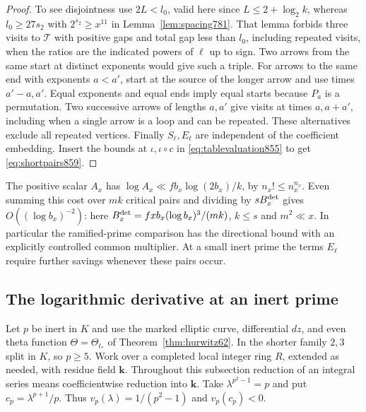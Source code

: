 \documentclass[a4paper,11pt]{article}
\theoremstyle{definition}
\theoremstyle{remark}
\numberwithin{equation}{section}
\begin{document}
\begin{proof}
To see disjointness use \(2L<l_0\), valid here since
\(L\le2+\log_2 k\), whereas \(l_0\ge27s_2\) with
\(2^{s_2}\ge x^{11}\) in Lemma~\ref{lem:spacing781}.
That lemma forbids three visits to \(\mathcal T\) with positive
gaps and total gap less than \(l_0\), including repeated
visits, when the ratios are the indicated powers of \(\ell\)
up to sign. Two arrows from the same start at distinct
exponents would give such a triple. For arrows to the same
end with exponents \(a<a'\), start at the source of the
longer arrow and use times \(a'-a,a'\). Equal exponents
and equal ends imply equal starts because \(P_a\) is a
permutation. Two successive arrows of lengths \(a,a'\)
give visits at times \(a,a+a'\), including when a single
arrow is a loop and can be repeated. These alternatives
exclude all repeated vertices. Finally \(S_\ell,E_\ell\)
are independent of the coefficient embedding. Insert the
bounds at \(\iota,\iota\circ c\) in \eqref{eq:tablevaluation855}
to get \eqref{eq:shortpairs859}.
\end{proof}

The positive scalar \(A_x\) has
\(\log A_x\ll f b_x\log(2b_x)/k\), by \(n_x!\le n_x^{n_x}\).
Even summing this cost over \(mk\) critical pairs and
dividing by \(sB_x^{\rm det}\) gives
\(O((\log b_x)^{-2})\): here
\(B_x^{\rm det}=fxb_x(\log b_x)^3/(mk)\), \(k\le s\) and
\(m^2\ll x\). In particular the ramified-prime comparison
has the directional bound with an explicitly controlled
common multiplier. At a small inert prime the terms
\(E_\ell\) require further savings whenever these pairs occur.
\clearpage

\subsection{The logarithmic derivative at an inert prime}
\label{sec:inertgradient860}
Let \(p\) be inert in \(K\) and use the marked elliptic curve,
differential \(dz\), and even theta function \(\Theta=\Theta_{t_*}\)
of Theorem~\ref{thm:hurwitz62}. In the shorter family \(2,3\)
split in \(K\), so \(p\ge5\). Work over a completed local
integer ring \(R\), extended as needed, with residue field
\(\mathbf k\). Throughout this subsection reduction of an
integral series means coefficientwise reduction into \(\mathbf k\).
Take \(\lambda^{p^2-1}=p\) and put \(c_p=\lambda^{p+1}/p\).
Thus \(v_p(\lambda)=1/(p^2-1)\) and \(v_p(c_p)<0\).
\end{document}
